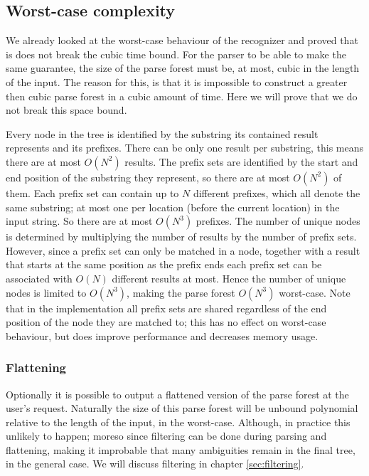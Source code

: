 \documentclass[a4paper,10pt]{article}
\begin{document}
\subsection{Worst-case complexity}
We already looked at the worst-case behaviour of the recognizer and proved that is does not break the cubic time bound. For the parser to be able to make the same guarantee, the size of the parse forest must be, at most, cubic in the length of the input. The reason for this, is that it is impossible to construct a greater then cubic parse forest in a cubic amount of time. Here we will prove that we do not break this space bound.

Every node in the tree is identified by the substring its contained result represents and its prefixes. There can be only one result per substring, this means there are at most $O(N^2)$ results. The prefix sets are identified by the start and end position of the substring they represent, so there are at most $O(N^2)$ of them. Each prefix set can contain up to $N$ different prefixes, which all denote the same substring; at most one per location (before the current location) in the input string. So there are at most $O(N^3)$ prefixes. The number of unique nodes is determined by multiplying the number of results by the number of prefix sets. However, since a prefix set can only be matched in a node, together with a result that starts at the same position as the prefix ends each prefix set can be associated with $O(N)$ different results at most. Hence the number of unique nodes is limited to $O(N^3)$, making the parse forest $O(N^3)$ worst-case. Note that in the implementation all prefix sets are shared regardless of the end position of the node they are matched to; this has no effect on worst-case behaviour, but does improve performance and decreases memory usage.

\subsubsection{Flattening}
Optionally it is possible to output a flattened version of the parse forest at the user's request. Naturally the size of this parse forest will be unbound polynomial relative to the length of the input, in the worst-case. Although, in practice this unlikely to happen; moreso since filtering can be done during parsing and flattening, making it improbable that many ambiguities remain in the final tree, in the general case. We will discuss filtering in chapter \ref{sec:filtering}.
\end{document}
